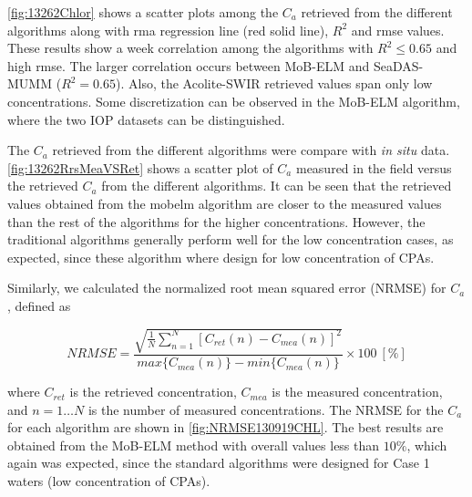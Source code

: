 \autoref{fig:13262Chlor}  shows a scatter plots among the $C_a$ retrieved from the different algorithms along with \gls{rma} regression line (red solid line), $R^2$ and \gls{rmse} values. These results show a week correlation among the algorithms with $R^2\leq0.65$ and high \gls{rmse}. The larger correlation occurs between MoB-ELM and SeaDAS-MUMM ($R^2=0.65$). Also, the Acolite-SWIR retrieved values span only low concentrations. Some discretization can be observed in the MoB-ELM algorithm, where the two IOP datasets can be distinguished.

The $C_a$ retrieved from the different algorithms were compare with {\it in situ} data. \autoref{fig:13262RrsMeaVSRet} shows a scatter plot of $C_a$ measured in the field versus the retrieved $C_a$ from the different algorithms. It can be seen that the retrieved values obtained from the \gls{mobelm} algorithm are closer to the measured values than the rest of the algorithms for the higher concentrations. However, the traditional algorithms generally perform well for the low concentration cases, as expected, since these algorithm where design for low concentration of CPAs. 

Similarly, we calculated the normalized root mean squared error (NRMSE) for $C_a$, defined as

\begin{equation}
\label{eq:NRMSEchl}
  NRMSE =\frac{\sqrt{\frac{1}{N}\sum_{n=1}^N{\left[C_{ret}(n) - C_{mea}(n)\right]^2}}}{max\{C_{mea}(n)\} - min\{C_{mea}(n)\}}\times100 ~[\%]
\end{equation}

\noindent where $C_{ret}$ is the retrieved concentration, $C_{mea}$ is the measured concentration, and $n=1\dots N$ is the number of measured concentrations. The NRMSE for the $C_a$ for each algorithm are shown in \autoref{fig:NRMSE130919CHL}. The best results are obtained from the MoB-ELM method with overall values less than $10\%$, which again was expected, since the standard algorithms were designed for Case 1 waters (low concentration of CPAs).

